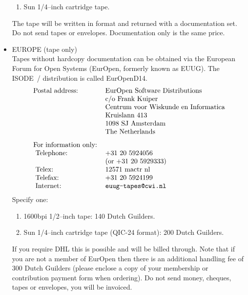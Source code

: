 \begin{itemize}
\begin{enumerate}
\item	Sun 1/4--inch cartridge tape.
\end{enumerate}
The tape will be written in  format and returned with
a documentation set.
Do not send tapes or envelopes.
Documentation only is the same price.  

\item	EUROPE (tape only)\\
Tapes without hardcopy documentation can be obtained via the European
Forum for Open Systems (EurOpen, formerly known as EUUG).
The ISODE~\isodevrsn/ distribution is called EurOpenD14.
\[\begin{tabular}{ll}
Postal address:&	EurOpen Software Distributions\\
&			c/o Frank Kuiper\\
&			Centrum voor Wiskunde en Informatica\\
&			Kruislann 413\\
&			1098 SJ  Amsterdam\\
&			The Netherlands\\[0.1in]
For information only:&\\
\ Telephone:&		+31 20 5924056\\
	&		(or +31 20 5929333)\\
\ Telex:&		12571 mactr nl\\
\ Telefax:&		+31 20 5924199\\
\ Internet:&		\verb"euug-tapes@cwi.nl"
\end{tabular}\]
Specify one:
\begin{enumerate}
\item	1600bpi 1/2--inch tape: 140 Dutch Guilders.

\item	Sun 1/4--inch cartridge tape (QIC-24 format): 200 Dutch Guilders.

\end{enumerate}
If you require DHL this is possible and will be billed through.
Note that if you are not a member of EurOpen
then there is an additional handling fee of 300 Dutch Guilders
(please enclose a copy of your membership or contribution payment form when
ordering). 
Do not send money, cheques, tapes or envelopes,
you will be invoiced.


\end{itemize}
